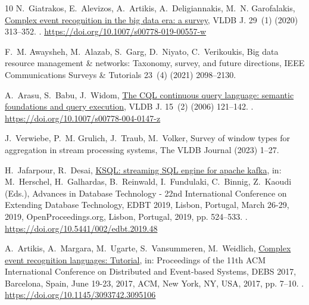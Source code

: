 \documentclass[5p,times]{elsarticle}
\begin{document}
\begin{thebibliography}{10}
N.~Giatrakos, E.~Alevizos, A.~Artikis, A.~Deligiannakis, M.~N. Garofalakis, \href{https://doi.org/10.1007/s00778-019-00557-w}{Complex event recognition in the big data era: a survey}, {VLDB} J. 29~(1) (2020) 313--352.
\newblock \href {http://dx.doi.org/10.1007/S00778-019-00557-W} {}.
\newline\urlprefix\url{https://doi.org/10.1007/s00778-019-00557-w}

F.~M. Awaysheh, M.~Alazab, S.~Garg, D.~Niyato, C.~Verikoukis, Big data resource management \& networks: Taxonomy, survey, and future directions, IEEE Communications Surveys \& Tutorials 23~(4) (2021) 2098--2130.

A.~Arasu, S.~Babu, J.~Widom, \href{https://doi.org/10.1007/s00778-004-0147-z}{The {CQL} continuous query language: semantic foundations and query execution}, {VLDB} J. 15~(2) (2006) 121--142.
\newblock \href {http://dx.doi.org/10.1007/S00778-004-0147-Z} {}.
\newline\urlprefix\url{https://doi.org/10.1007/s00778-004-0147-z}

J.~Verwiebe, P.~M. Grulich, J.~Traub, M.~Volker, Survey of window types for aggregation in stream processing systems, The VLDB Journal (2023) 1--27.

H.~Jafarpour, R.~Desai, \href{https://doi.org/10.5441/002/edbt.2019.48}{{KSQL:} streaming {SQL} engine for apache kafka}, in: M.~Herschel, H.~Galhardas, B.~Reinwald, I.~Fundulaki, C.~Binnig, Z.~Kaoudi (Eds.), Advances in Database Technology - 22nd International Conference on Extending Database Technology, {EDBT} 2019, Lisbon, Portugal, March 26-29, 2019, OpenProceedings.org, Lisbon, Portugal, 2019, pp. 524--533.
\newblock \href {http://dx.doi.org/10.5441/002/EDBT.2019.48} {}.
\newline\urlprefix\url{https://doi.org/10.5441/002/edbt.2019.48}

A.~Artikis, A.~Margara, M.~Ugarte, S.~Vansummeren, M.~Weidlich, \href{https://doi.org/10.1145/3093742.3095106}{Complex event recognition languages: Tutorial}, in: Proceedings of the 11th {ACM} International Conference on Distributed and Event-based Systems, {DEBS} 2017, Barcelona, Spain, June 19-23, 2017, {ACM}, New York, NY, USA, 2017, pp. 7--10.
\newblock \href {http://dx.doi.org/10.1145/3093742.3095106} {}.
\newline\urlprefix\url{https://doi.org/10.1145/3093742.3095106}


\end{thebibliography}
\end{document}
